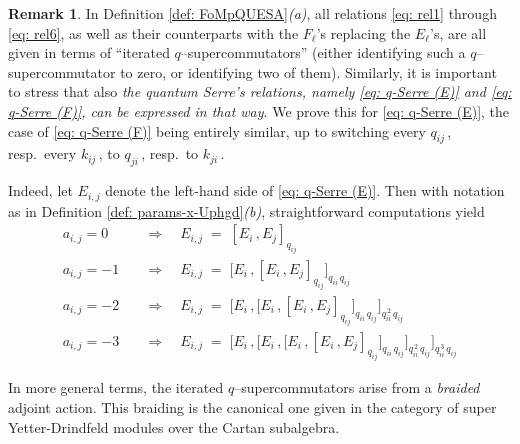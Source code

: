 \documentclass[12pt,reqno,twoside,a4paper]{amsart}
\numberwithin{equation}{section}
\theoremstyle{definition}
\newtheorem{rmk}[lema]{Remark}
\newtheorem{free text}[lema]{}
\theoremstyle{remark}
\theoremstyle{plain}
\begin{document}
\vskip9pt

\begin{rmk}  \label{rmk: q-Serre = iterated q-commutator}
%
 In  Definition \ref{def: FoMpQUESA}\textit{(a)},  all relations  \eqref{eq: rel1}
 through  \eqref{eq: rel6},  as well as their counterparts with the  $ F_\ell $'s
 replacing the  $ E_\ell $'s,  are all given in terms of ``iterated
 $ q $--supercommutators''  (either identifying such a  $ q $--supercommutator  to zero,
 or identifying two of them).  Similarly, it is important to stress that also
 \textsl{the quantum Serre's relations, namely  \eqref{eq: q-Serre (E)}  and
 \eqref{eq: q-Serre (F)},  can be expressed in that way}.
 We prove this for  \eqref{eq: q-Serre (E)},  the case of  \eqref{eq: q-Serre (F)}  being entirely similar, up to switching every  $ q_{ij} \, $,  resp.\  every  $ k_{ij} \, $,  to  $ q_{ji} \, $,  resp.\ to $ k_{ji} \, $.
                                                        \par
   Indeed, let  $ E_{i,j} $  denote the left-hand side of  \eqref{eq: q-Serre (E)}.  Then with notation as in  Definition \ref{def: params-x-Uphgd}\textit{(b)},  straightforward computations yield
%
\begin{align}
%
\label{eq: q-S = q-bra (0)}
   a_{i,j} = 0  &  \quad \Longrightarrow \quad
   E_{i,j} \; = \; {[E_i \, , E_j]}_{q_{ij}} \qquad
   \\
%
\label{eq: q-S = q-bra (1)}
   a_{i,j} = -1  &  \quad \Longrightarrow \quad  E_{i,j} \; = \; \big[ E_i \, , {[E_i \, , E_j]}_{q_{ij}} \big]_{q_{ii} \, q_{ij}}  \\
%
\label{eq: q-S = q-bra (2)}
   a_{i,j} = -2  &  \quad \Longrightarrow \quad  E_{i,j} \; = \; \Big[ E_i \, ,
   \big[ E_i \, , {[E_i \, , E_j]}_{q_{ij}} \big]_{q_{ii} \, q_{ij}} \Big]_{q_{ii}^{\,2} \, q_{ij}}  \\
%
\label{eq: q-S = q-bra (3)}
   a_{i,j} = -3  &  \quad \Longrightarrow \quad  E_{i,j} \; = \; \bigg[ E_i \, , \Big[ E_i \, ,
   \big[ E_i \, , {[E_i \, , E_j]}_{q_{ij}} \big]_{q_{ii} \, q_{ij}}
   \Big]_{q_{ii}^{\,2} \, q_{ij}} \bigg]_{q_{ii}^{\,3} \, q_{ij}}
%
\end{align}

                                                                 \par
   In more general terms, the iterated  $ q $--supercommutators
   arise from a  \emph{braided} adjoint action.
   This braiding is the canonical one given in the category of super
   Yetter-Drindfeld modules over the Cartan subalgebra.
%
\end{rmk}
\end{document}
